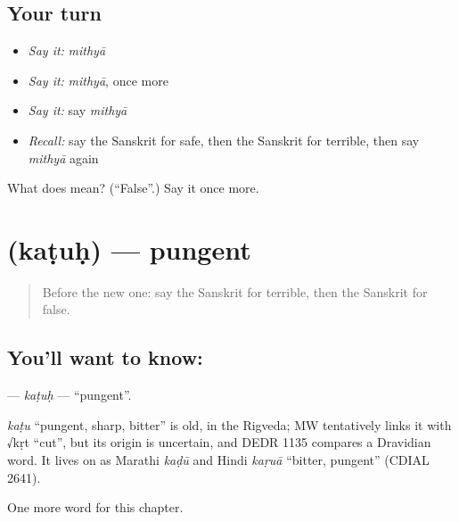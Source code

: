 \subsection*{Your turn}
\begin{itemize}
\raggedright
  \item \emph{Say it:} \emph{mithyā}
  \item \emph{Say it:} \emph{mithyā}, once more
  \item \emph{Say it:} say \emph{mithyā}
  \item \emph{Recall:} say the Sanskrit for safe, then the Sanskrit for terrible, then say \emph{mithyā} again
\end{itemize}

\begin{tcolorbox}[breakable,colback=teal!4,colframe=teal!35!black,title={Before you move on}]
What does  mean? (\textquotedblleft{}False\textquotedblright{}.) Say it once more.
\end{tcolorbox}
\section[\texorpdfstring{\sk{कटुः} (kaṭuḥ)}{कटुः (kaṭuḥ)}]{ (kaṭuḥ) — pungent}

\label{lesson:SA-C128-katuh}



\begin{quote}
Before the new one: say the Sanskrit for terrible, then the Sanskrit for false.
\end{quote}

\subsection*{You'll want to know: }
\textbf{} — \emph{kaṭuḥ} — \textquotedblleft{}pungent\textquotedblright{}.

\begin{cousinweb}
\emph{kaṭu} \textquotedblleft{}pungent, sharp, bitter\textquotedblright{} is old, in the Rigveda; MW tentatively links it with √kṛt \textquotedblleft{}cut\textquotedblright{}, but its origin is uncertain, and DEDR 1135 compares a Dravidian word. It lives on as Marathi \emph{kaḍū} and Hindi \emph{kaṛuā} \textquotedblleft{}bitter, pungent\textquotedblright{} (CDIAL 2641).
\end{cousinweb}

\begin{grammarlens}[title={What you've built}]
One more word for this chapter.
\end{grammarlens}

